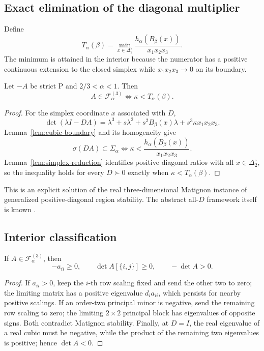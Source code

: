 \subsection{Exact elimination of the diagonal multiplier}

Define
\[
\boxed{
T_\alpha(\beta)
=
\min_{x\in\Delta_2^\circ}
\frac{h_\alpha(B_\beta(x))}
{x_1x_2x_3}.
}
\]
The minimum is attained in the interior because the numerator has a positive continuous extension to the closed simplex while \(x_1x_2x_3\to0\) on its boundary.

\begin{theorem}
\label{thm:C10}
Let \(-A\) be strict P and \(2/3<\alpha<1\). Then
\[
\boxed{
A\in\mathcal F_\alpha^{(3)}
\iff
\kappa<T_\alpha(\beta).
}
\]
\end{theorem}

\begin{proof}
For the simplex coordinate \(x\) associated with \(D\),
\[
\det(\lambda I-DA)
=
\lambda^3+s\lambda^2+s^2B_\beta(x)\lambda
+s^3\kappa x_1x_2x_3.
\]
Lemma~\ref{lem:cubic-boundary} and its homogeneity give
\[
\sigma(DA)\subset\Sigma_\alpha
\iff
\kappa
<
\frac{h_\alpha(B_\beta(x))}
{x_1x_2x_3}.
\]
Lemma~\ref{lem:simplex-reduction} identifies positive diagonal ratios with all \(x\in\Delta_2^\circ\), so the inequality holds for every \(D\succ0\) exactly when \(\kappa<T_\alpha(\beta)\).
\end{proof}

This is an explicit solution of the real three-dimensional Matignon instance of generalized positive-diagonal region stability. The abstract all-\(D\) framework itself is known \citep{Kushel2019,KushelPavani2022}.

\subsection{Interior classification}

\begin{lemma}[\(P_0\) necessity]
\label{lem:P0}
If \(A\in\mathcal F_\alpha^{(3)}\), then
\[
-a_{ii}\ge0,
\qquad
\det A[\{i,j\}]\ge0,
\qquad
-\det A>0.
\]
\end{lemma}

\begin{proof}
If \(a_{ii}>0\), keep the \(i\)-th row scaling fixed and send the other two to zero; the limiting matrix has a positive eigenvalue \(d_i a_{ii}\), which persists for nearby positive scalings. If an order-two principal minor is negative, send the remaining row scaling to zero; the limiting \(2\times2\) principal block has eigenvalues of opposite signs. Both contradict Matignon stability. Finally, at \(D=I\), the real eigenvalue of a real cubic must be negative, while the product of the remaining two eigenvalues is positive; hence \(\det A<0\).
\end{proof}

